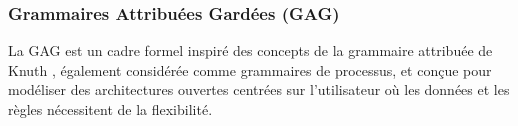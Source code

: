 




\subsubsection{Grammaires Attribuées Gardées (GAG)}
La GAG \cite{badouel2015active} est un cadre formel inspiré des concepts de la grammaire attribuée de Knuth \cite{klint2005toward}, également considérée comme grammaires de processus, et conçue pour modéliser des architectures ouvertes centrées sur l'utilisateur où les données et les règles nécessitent de la flexibilité.


